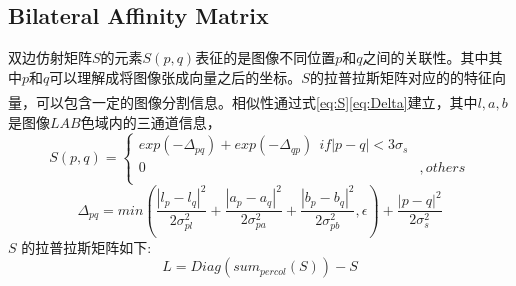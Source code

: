 \documentclass[UTF8]{ctexart}
\newcommand{\myciteup}[1]{\textsuperscript{\textsuperscript{\cite{#1}}}}
\begin{document}
\begin{sloppypar}
        \subsection{Bilateral Affinity Matrix}
        双边仿射矩阵$S$的元素$S(p,q)$表征的是图像不同位置$p$和$q$之间的关联性。其中其中$p$和$q$可以理解成将图像张成向量之后的坐标。$S$的拉普拉斯矩阵对应的的特征向量，可以包含一定的图像分割信息。相似性通过式\eqref{eq:S}\eqref{eq:Delta}建立\myciteup{2017Depth}，其中$l,a,b$是图像$LAB$色域内的三通道信息，
        \begin{equation}
            S(p,q)=\left \{
            \begin{array}{cc}
                exp(-\Delta_{pq})+exp(-\Delta_{qp}) \ \ if \left | p - q  \right | <3\sigma_s\\
                0&, others\\
            \end{array} \right.
            \label{eq:S}
        \end{equation}
        \begin{equation}
            \Delta_{pq} = min(\frac{\left | l_p - l_q \right |^2}{2\sigma_{pl}^2} +
            \frac{\left | a_p - a_q \right |^2}{2\sigma_{pa}^2} +
            \frac{\left | b_p - b_q \right |^2}{2\sigma_{pb}^2},\epsilon) +
            \frac{\left | p-q\right |^2}{2\sigma_{s}^2}
            \label{eq:Delta}
        \end{equation}
        $S$ 的拉普拉斯矩阵如下:
        \begin{equation}
            L = Diag(sum_{per col}(S)) - S
            \label{eq:L}
        \end{equation}

\end{sloppypar}
\end{document}
